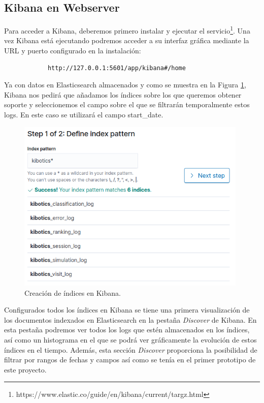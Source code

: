 \documentclass[a4paper, 12pt]{book}
\begin{document}
	
	\subsection{Kibana en Webserver}
	\label{subsec:kibana_kibotics}
		Para acceder a Kibana, deberemos primero instalar y ejecutar el servicio\footnote{https://www.elastic.co/guide/en/kibana/current/targz.html}. Una vez Kibana está ejecutando podremos acceder a su interfaz gráfica mediante la URL y puerto configurado en la instalación:
		
		{\footnotesize
		\begin{verbatim}
			http://127.0.0.1:5601/app/kibana#/home
		\end{verbatim}
		}
	
		Ya con datos en Elasticsearch almacenados y como se muestra en la Figura \ref{fig:index_pattern_kibana}, Kibana nos pedirá que añadamos los índices sobre los que queremos obtener soporte y seleccionemos el campo sobre el que se filtrarán temporalmente estos logs. En este caso se utilizará el campo start\_date.
		
		\begin{figure}[H]
			\centering
			\includegraphics[width=11cm, keepaspectratio]{img/index_pattern_kibana.png}
			\caption{Creación de índices en Kibana.}
			\label{fig:index_pattern_kibana}
		\end{figure}
		
		Configurados todos los índices en Kibana se tiene una primera visualización de los documentos indexados en Elasticsearch en la pestaña \textit{Discover} de Kibana. En esta pestaña podremos ver todos los logs que estén almacenados en los índices, así como un histograma en el que se podrá ver gráficamente la evolución de estos índices en el tiempo. Además, esta sección \textit{Discover} proporciona la posibilidad de filtrar por rangos de fechas y campos así como se tenía en el primer prototipo de este proyecto.\\
		
\end{document}
